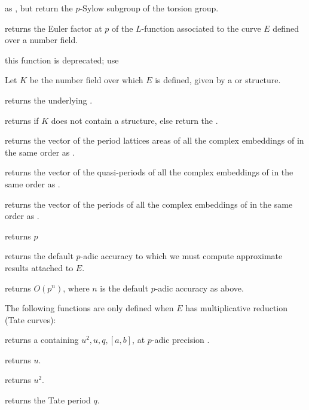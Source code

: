  as , but return the
$p$-Sylow subgroup of the torsion group.

 returns the Euler factor at $p$ of
the $L$-function associated to the curve $E$ defined over a number field.


 this function is deprecated; use


Let $K$ be the number field over which $E$ is defined, given by
a  or  structure.

 returns the underlying .

 returns  if $K$ does not contain
a  structure, else return the .

 returns the vector of the period lattices areas
of all the complex embeddings of  in the same order as .

 returns the vector of the quasi-periods of
all the complex embeddings of  in the same order as .

 returns the vector of the periods of
all the complex embeddings of  in the same order as .


 returns $p$

 returns the default $p$-adic accuracy to
which we must compute approximate results attached to $E$.

 returns $O(p^n)$, where $n$ is the default
$p$-adic accuracy as above.

The following functions are only defined when $E$ has multiplicative
reduction (Tate curves):

 returns a
 containing $u^2, u, q, [a,b]$, at $p$-adic precision .

 returns $u$.

 returns $u^2$.

 returns the Tate period $q$.

